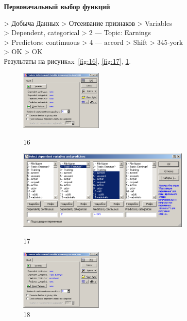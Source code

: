 \newpage

\begin{center}
  \textbf{Первоначальный выбор функций}
\end{center}

> Добыча Данных > Отсеивание признаков > Variables \\
> Dependent, categorical > 2 — Topic: Earnings \\
> Predictors; contimuous > 4 — accord > Shift > 345-york \\
> OK > OK \\

Результаты на рисункax~\ref{fig:16}, \ref{fig:17}, \ref{fig:18}.

\begin{figure}[!h]
  \centering

  \begin{minipage}{0.22\textwidth}
    \centering

    \includegraphics[height=3cm]
    {inc/16.PNG}

    \caption{16}

    \label{fig:16}
  \end{minipage}
  \begin{minipage}{0.52\textwidth}
    \centering

    \includegraphics[height=4cm]
    {inc/17.PNG}

    \caption{17}

    \label{fig:17}
  \end{minipage}
  \begin{minipage}{0.22\textwidth}
    \centering

    \includegraphics[height=3cm]
    {inc/18.PNG}

    \caption{18}

    \label{fig:18}
  \end{minipage}
\end{figure}

